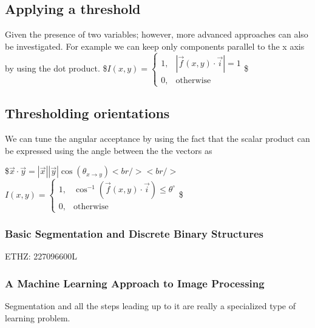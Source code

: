 \documentclass[letterpaper,10pt,english]{sphinxmanual}
\begin{document}
\noindent{}


\subsection{Applying a threshold}
\label{\detokenize{04-BasicSegmentation:applying-a-threshold}}
\sphinxAtStartPar
Given the presence of two variables; however, more advanced approaches can also be investigated. For example we can keep only components parallel to the x axis by using the dot product.
\$\( I(x,y) = 
\begin{cases}
1, & |\vec{f}(x,y)\cdot \vec{i}| = 1 \\
0, & \text{otherwise}
\end{cases}\)\$


\subsection{Thresholding orientations}
\label{\detokenize{04-BasicSegmentation:thresholding-orientations}}
\sphinxAtStartPar
We can tune the angular acceptance by using the fact that the scalar product can be expressed using the angle between the the vectors as

\sphinxAtStartPar
{}
\$\(\vec{x}\cdot\vec{y}=|\vec{x}| |\vec{y}| \cos(\theta_{x\rightarrow y}) \)\(
<br />
<br />
\)\( I(x,y) = 
\begin{cases}
1, & \cos^{-1}(\vec{f}(x,y)\cdot \vec{i}) \leq \theta^{\circ} \\
0, & \text{otherwise}
\end{cases}\)\$


\subsubsection{Basic Segmentation and Discrete Binary Structures}
\label{\detokenize{04-BasicSegmentation_Part2:basic-segmentation-and-discrete-binary-structures}}\label{\detokenize{04-BasicSegmentation_Part2::doc}}


\sphinxAtStartPar
{} ETHZ: 227\sphinxhyphen{}0966\sphinxhyphen{}00L

\sphinxAtStartPar
{}






\subsubsection{A Machine Learning Approach to Image Processing}
\label{\detokenize{04-BasicSegmentation_Part2:a-machine-learning-approach-to-image-processing}}
\sphinxAtStartPar
Segmentation and all the steps leading up to it are really a specialized type of learning problem.
\end{document}
